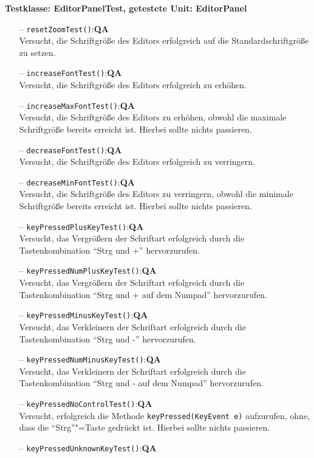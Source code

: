 \documentclass[parskip=full,11pt,twoside]{scrartcl}
\def\qa{\hfill\textbf{QA}}
\begin{document}
\textbf{Testklasse: EditorPanelTest, getestete Unit: EditorPanel}
\begin{itemize}
	\item[--] \texttt{resetZoomTest()}:\qa\\
	Versucht, die Schriftgröße des Editors erfolgreich auf die Standardschriftgröße zu setzen.
	\item[--] \texttt{increaseFontTest()}:\qa\\
	Versucht, die Schriftgröße des Editors erfolgreich zu erhöhen.
	\item[--] \texttt{increaseMaxFontTest()}:\qa\\
	Versucht, die Schriftgröße des Editors zu erhöhen, obwohl die maximale Schriftgröße bereits erreicht ist. Hierbei sollte nichts passieren.
	\item[--] \texttt{decreaseFontTest()}:\qa\\
	Versucht, die Schriftgröße des Editors erfolgreich zu verringern.
	\item[--] \texttt{decreaseMinFontTest()}:\qa\\
	Versucht, die Schriftgröße des Editors zu verringern, obwohl die minimale Schriftgröße bereits erreicht ist. Hierbei sollte nichts passieren.
	\item[--] \texttt{keyPressedPlusKeyTest()}:\qa\\
	Versucht, das Vergrößern der Schriftart erfolgreich durch die Tastenkombination \enquote{Strg und +} hervorzurufen.
	\item[--] \texttt{keyPressedNumPlusKeyTest()}:\qa\\
	Versucht, das Vergrößern der Schriftart erfolgreich durch die Tastenkombination \enquote{Strg und + auf dem Numpad} hervorzurufen.
	\item[--] \texttt{keyPressedMinusKeyTest()}:\qa\\
	Versucht, das Verkleinern der Schriftart erfolgreich durch die Tastenkombination \enquote{Strg und -} hervorzurufen.
	\item[--] \texttt{keyPressedNumMinusKeyTest()}:\qa\\
	Versucht, das Verkleinern der Schriftart erfolgreich durch die Tastenkombination \enquote{Strg und - auf dem Numpad} hervorzurufen.
	\item[--] \texttt{keyPressedNoControlTest()}:\qa\\
	Versucht, erfolgreich die Methode \texttt{keyPressed(KeyEvent e)} aufzurufen, ohne, dass die \enquote{Strg}"=Taste gedrückt ist. Hierbei sollte nichts passieren.
	\item[--] \texttt{keyPressedUnknownKeyTest()}:\qa\\

\end{itemize}
\end{document}

